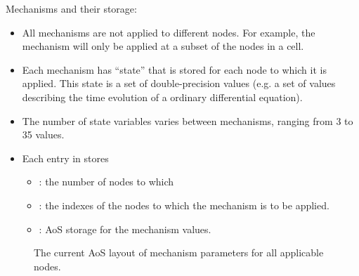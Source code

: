 \noindent
Mechanisms and their storage:
\begin{itemize}
\item
    All mechanisms are not applied to different nodes. For example, the  mechanism will only be applied at a subset of the nodes in a cell.
\item
    Each mechanism has ``state'' that is stored for each node to which it is applied. This state is a set of double-precision values (e.g. a set of values describing the time evolution of a ordinary differential equation).
\item
    The number of state variables varies between mechanisms, ranging from 3 to 35 values.
\item
    Each entry in  stores 
    \begin{itemize}
    \item
        : the number of nodes to which
    \item
        : the indexes of the nodes to which the mechanism is to be applied.
    \item
        : AoS storage for the mechanism  values.
    \end{itemize}
\end{itemize}


\begin{figure}[htp!]

\caption{The current AoS layout of mechanism parameters for all applicable nodes.}
\end{figure}

